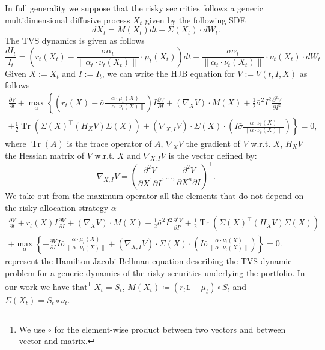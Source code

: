 \documentclass[11pt]{article}
\newcommand{\tr}[1]{{#1}^{\intercal}} %
\DeclareMathOperator{\Tr}{Tr}
\begin{document}
In full generality we suppose that the risky securities follows a generic multidimensional diffusive process $X_t$ given by the following SDE
\begin{equation}
		dX_t = M(X_t)dt + \Sigma(X_t) \cdot dW_t.
\end{equation}
The TVS dynamics is given as follows 
\begin{equation}
	\frac{dI_t}{I_t} = \left(r_t(X_t) -  \frac{\bar{\sigma} \alpha_t}{\|\alpha_t \cdot \nu_t(X_t)\|}  \cdot \mu_t(X_t)    \right)dt +\frac{\bar{\sigma}\alpha_t }{\|\alpha_t \cdot \nu_t(X_t) \|} \cdot \nu_t(X_t) \cdot dW_t
\end{equation}
Given $X := X_t$ and $I := I_t$, we can write the HJB equation for $V := V(t,I,X)$ as follows
\begin{equation}
	\begin{aligned}
		\frac{\partial V}{\partial t} + \max_\alpha  \left\{   \left(r_t(X) - \bar{\sigma}\frac{\alpha \cdot \mu_t(X)}{\|\alpha \cdot \nu_t(X)\|}\right) I \frac{\partial V}{\partial I} + (\nabla_X V) \cdot M(X) + \frac{1}{2} \bar{\sigma}^2I^2 \frac{\partial^2V}{\partial I^2}  \right.\\ 
		\left. +\frac{1}{2}\Tr\left(\tr{\Sigma(X)}(H_XV)\Sigma(X)\right)  + (\nabla_{X,I}V) \cdot \Sigma(X) \cdot \left(I\bar{\sigma}\frac{\alpha \cdot \nu_t(X)}{\|\alpha \cdot \nu_t(X)\|}\right)\right\} = 0,
	\end{aligned}
\end{equation}
where $\Tr(A)$ is the trace operator of $A$, $\nabla_X V$ the gradient of $V$ w.r.t. $X$, $H_XV$ the Hessian matrix of $V$ w.r.t. $X$ and $\nabla_{X,I}V $ is the vector defined by:
\begin{equation}
	\nabla_{X,I} V= \tr{\left(\frac{\partial^2 V}{\partial X^1 \partial I},\dots, \frac{\partial^2 V}{\partial X^n \partial I} \right)}.
\end{equation}
We take out from the maximum operator all the elements that do not depend on the risky allocation strategy $\alpha$
\begin{equation}
	\begin{aligned}
		\frac{\partial V}{\partial t} +   r_t(X) I \frac{\partial V}{\partial I} + (\nabla_X V) \cdot M(X) + \frac{1}{2} \bar{\sigma}^2I^2 \frac{\partial^2V}{\partial I^2} + \frac{1}{2}\Tr\left(\tr{\Sigma(X)}(H_XV)\Sigma(X)\right)  \\ 
		+\max_\alpha  \left\{  -\frac{\partial V}{\partial I} I  \bar{\sigma}\frac{\alpha \cdot \mu_t(X)}{\|\alpha \cdot \nu_t(X)\|} + 
		(\nabla_{X,I}V) \cdot \Sigma(X) \cdot \left(I\bar{\sigma}\frac{\alpha \cdot \nu_t(X)}{\|\alpha \cdot \nu_t(X)\|}\right)\right\} = 0.
		\end{aligned}
\label{eq:HJB_general}\end{equation}
 represent the Hamilton-Jacobi-Bellman equation describing the TVS dynamic problem for a generic dynamics of the risky securities underlying the portfolio.
In our work we have that\footnote{We use $\circ$ for the element-wise product between two vectors and between vector and matrix.} $X_t = S_t$, $M(X_t) \coloneqq (r_t\mathds{1} - \mu_t)\circ S_t$ and $\Sigma(X_t) = S_t \circ \nu_t$.
\end{document}
